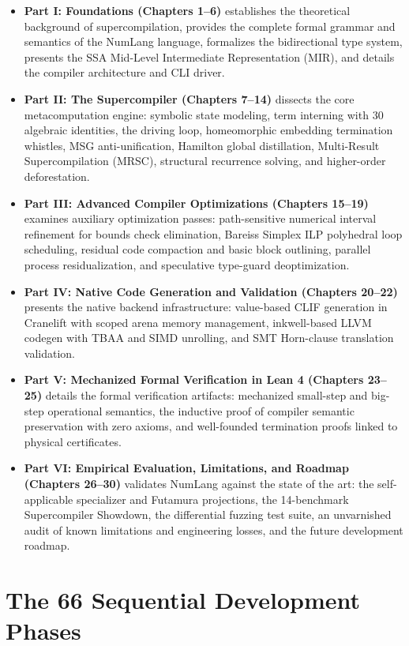 \begin{itemize}
    \item \textbf{Part I: Foundations (Chapters 1--6)} establishes the theoretical background of supercompilation, provides the complete formal grammar and semantics of the NumLang language, formalizes the bidirectional type system, presents the SSA Mid-Level Intermediate Representation (MIR), and details the compiler architecture and CLI driver.
    \item \textbf{Part II: The Supercompiler (Chapters 7--14)} dissects the core metacomputation engine: symbolic state modeling, term interning with 30 algebraic identities, the driving loop, homeomorphic embedding termination whistles, MSG anti-unification, Hamilton global distillation, Multi-Result Supercompilation (MRSC), structural recurrence solving, and higher-order deforestation.
    \item \textbf{Part III: Advanced Compiler Optimizations (Chapters 15--19)} examines auxiliary optimization passes: path-sensitive numerical interval refinement for bounds check elimination, Bareiss Simplex ILP polyhedral loop scheduling, residual code compaction and basic block outlining, parallel process residualization, and speculative type-guard deoptimization.
    \item \textbf{Part IV: Native Code Generation and Validation (Chapters 20--22)} presents the native backend infrastructure: value-based CLIF generation in Cranelift with scoped arena memory management, inkwell-based LLVM codegen with TBAA and SIMD unrolling, and SMT Horn-clause translation validation.
    \item \textbf{Part V: Mechanized Formal Verification in Lean 4 (Chapters 23--25)} details the formal verification artifacts: mechanized small-step and big-step operational semantics, the inductive proof of compiler semantic preservation with zero axioms, and well-founded termination proofs linked to physical certificates.
    \item \textbf{Part VI: Empirical Evaluation, Limitations, and Roadmap (Chapters 26--30)} validates NumLang against the state of the art: the self-applicable specializer and Futamura projections, the 14-benchmark Supercompiler Showdown, the differential fuzzing test suite, an unvarnished audit of known limitations and engineering losses, and the future development roadmap.
\end{itemize}


\section{The 66 Sequential Development Phases}
\label{sec:intro:all_phases}

